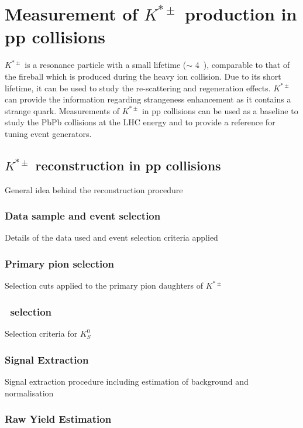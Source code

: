 \chapter{Measurement of $K^{*\pm}$ production in pp collisions}
\label{cap:5}


\vspace*{2cm}
$K^{*\pm}$ is a resonance particle with a small lifetime ($\sim$ 4~\fmc), comparable to that of the fireball which is produced during the heavy ion collision. Due to its short lifetime, it can be used to study the re-scattering and regeneration effects. $K^{*\pm}$ can provide the information regarding strangeness enhancement as it contains a strange quark. Measurements of $K^{*\pm}$  in pp collisions can be used as a baseline to study the PbPb collisions at the LHC energy and to provide a reference for tuning event generators.  


\section{$K^{*\pm}$  reconstruction in pp collisions}
\label{par:5.1}

General idea behind the reconstruction procedure

\subsection{Data sample and event selection}
\label{par:5.1a}
Details of the data used and event selection criteria applied

\subsection{Primary pion selection}
\label{par:5.1b} 
Selection cuts applied to the primary pion daughters of $K^{*\pm}$ 

 
\subsection{\VZERO~selection}
\label{par:5.1c} 
Selection criteria for $K^{0}_{S}$ 

\subsection{Signal Extraction}
\label{par:5.1d}
Signal extraction procedure including estimation of background and normalisation

\subsection{Raw Yield Estimation}
\label{par:5.1e} 

